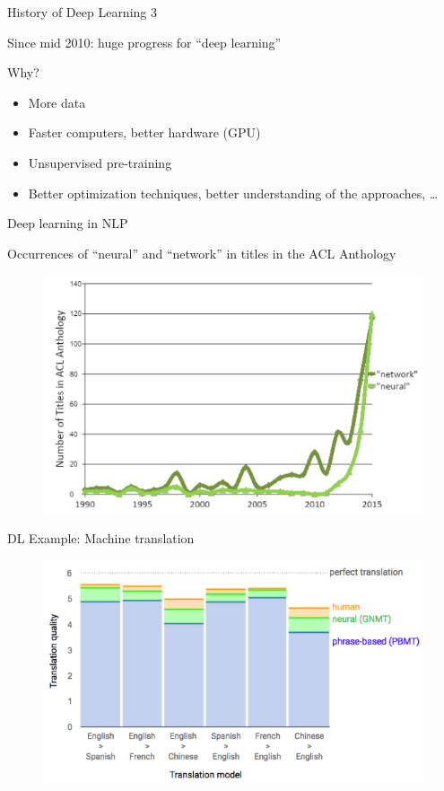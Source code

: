 \documentclass[12pt]{beamer}
\begin{document}
\begin{frame}{History of Deep Learning 3}
	
Since mid 2010: huge progress for “deep learning”

Why?
\begin{itemize}
	\item More data
	\item Faster computers, better hardware (GPU)
	\item Unsupervised pre-training
	\item Better optimization techniques, better understanding of the approaches, …
\end{itemize}
	
\end{frame}


\begin{frame}{Deep learning in NLP}
	
Occurrences of “neural” and “network” in titles in the ACL Anthology


\begin{figure}
\includegraphics[width=0.7\linewidth]{img/screenshot_2021-03-24_15-06-54}	
\end{figure}
	
\end{frame}


\begin{frame}{DL Example: Machine translation}
\begin{figure}
\includegraphics[width=0.9\linewidth]{img/screenshot_2021-03-24_15-09-30}
\end{figure}
	
\end{frame}
\end{document}
